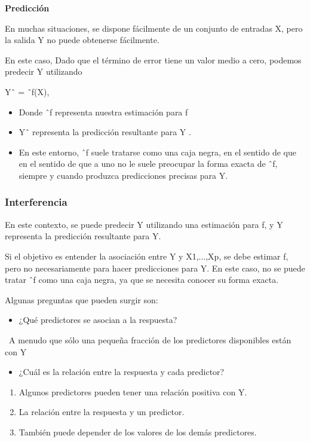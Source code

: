 \documentclass[
  letterpaper,
  DIV=11,
  numbers=noendperiod]{scrartcl}
\providecommand{\tightlist}{%
  \setlength{\itemsep}{0pt}\setlength{\parskip}{0pt}}\usepackage{longtable,booktabs,array}
\begin{document}
\textbf{Predicción}

En muchas situaciones, se dispone fácilmente de un conjunto de entradas
X, pero la salida Y no puede obtenerse fácilmente.

En este caso, Dado que el término de error tiene un valor medio a cero,
podemos predecir Y utilizando

Yˆ = ˆf(X),

\begin{itemize}
\item
  Donde ˆf representa nuestra estimación para f
\item
  Yˆ representa la predicción resultante para Y .
\item
  En este entorno, ˆf suele tratarse como una caja negra, en el sentido
  de que en el sentido de que a uno no le suele preocupar la forma
  exacta de ˆf, siempre y cuando produzca predicciones precisas para Y.
\end{itemize}

\hypertarget{interferencia}{%
\subsubsection{\texorpdfstring{\textbf{Interferencia}}{Interferencia}}\label{interferencia}}

En este contexto, se puede predecir Y utilizando una estimación para f,
y Y representa la predicción resultante para Y.

Si el objetivo es entender la asociación entre Y y X1,...,Xp, se debe
estimar f, pero no necesariamente para hacer predicciones para Y. En
este caso, no se puede tratar ˆf como una caja negra, ya que se necesita
conocer su forma exacta.

Algunas preguntas que pueden surgir son:

\begin{itemize}
\tightlist
\item
  ¿Qué predictores se asocian a la respuesta?
\end{itemize}

~A menudo que sólo una pequeña fracción de los predictores disponibles
están con Y

\begin{itemize}
\tightlist
\item
  ¿Cuál es la relación entre la respuesta y cada predictor?
\end{itemize}

\begin{enumerate}
\def\labelenumi{\arabic{enumi}.}
\item
  Algunos predictores pueden tener una relación positiva con Y.
\item
  La relación entre la respuesta y un predictor.
\item
  También puede depender de los valores de los demás predictores.
\end{enumerate}
\end{document}
